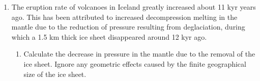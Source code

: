 \documentclass{template}
\newcommand{\solution}[1]{%
\iftoggle{showanswers}{%
\begin{solutionbox}
        #1
\end{solutionbox}%
  }{}%
}
\begin{document}
\begin{enumerate}[label=\textbf{\arabic*.}]
\begin{enumerate}[label=\Alph*)]
{        \begin{align*}
            m &= \rho V \\
            &= \left(\qty{4000}{\kg\per\m\cubed}\right)\left(\qty{6.42e19}{\m\cubed}\right)\\
            &\approx \qty{2.57e23}{\kg}
        \end{align*}

        Mass of water at saturation (1 wt\%):

        \begin{align*}
            \qty{2.57e23}{\kg} \cdot \frac{\qty{1}{\percent}}{100} &\approx \qty{2.57e21}{\kg}\\
            \implies \frac{\qty{2.57e21}{\kg}}{\qty{1.4e21}{\kg\per ocean}} &\boxed{\approx \qty{1.8}{oceans}}
        \end{align*}

    }
\end{enumerate}

\newpage
\item The eruption rate of volcanoes in Iceland greatly increased about 11 kyr years ago. This has been attributed to increased decompression melting in the mantle due to the reduction of pressure resulting from deglaciation, during which a 1.5 km thick ice sheet disappeared around 12 kyr ago.

\begin{enumerate}[label=\Alph*)]

    \item Calculate the decrease in pressure in the mantle due to the removal of the ice sheet. Ignore any geometric effects caused by the finite geographical size of the ice sheet.

    \solution{

        Ignoring any geometric effects implies that the change in pressure is not laterally heterogeneous. The pressure in the mantle is the sum of the pressure applied by the overriding ice sheet, the lithosphere, and the overlying air column. Assuming that the lithosphere and air column are unchanged, the decrease in pressure can be calculated as follows, taking the density of ice ($\rho_{\text{ice}}$) as \qty{917}{\kg\per\m\cubed}:

        \begin{align*}
            \Delta P &= \rho_{\text{ice}} g h\\
            &= \qty{917}{\kg\per\m\cubed} \cdot \qty{9.81}{\m\per\s\squared} \cdot \qty{1.5e3}{\m}\\
            &\approx \boxed{\qty{13.5}{\MPa}}
        \end{align*}
    }


\end{enumerate}
\end{enumerate}
\end{document}
